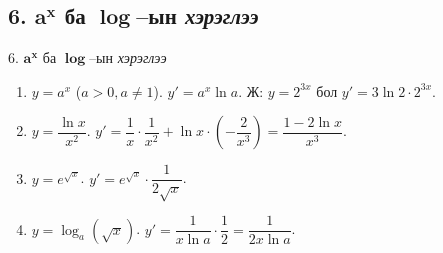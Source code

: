 \subsection*{6. $\boldsymbol{a^x}$ ба $\boldsymbol{\log}$–ын \emph{хэрэглээ}}
\begin{frame}[allowframebreaks]{6. $\boldsymbol{a^x}$ ба $\boldsymbol{\log}$–ын \emph{хэрэглээ}}
\begin{example}
\begin{enumerate}
  \item $y=a^x$ ($a>0,a\ne1$). $y'=a^x\ln a$. \;
        Ж: $y=2^{3x}$ бол $y'=3\ln2\cdot 2^{3x}$.
  \item $y=\dfrac{\ln x}{x^2}$.\; $y'=\dfrac{1}{x}\cdot\dfrac{1}{x^2} + \ln x \cdot \left(-\dfrac{2}{x^3}\right)=\dfrac{1-2\ln x}{x^3}$.
  \item $y=e^{\sqrt{x}}$.\; $y'=e^{\sqrt{x}}\cdot\dfrac{1}{2\sqrt{x}}$.
  \item $y=\log_a(\sqrt{x})$.\; $y'=\dfrac{1}{x\ln a}\cdot\dfrac{1}{2}=\dfrac{1}{2x\ln a}$.
\end{enumerate}
\end{example}
\end{frame}



